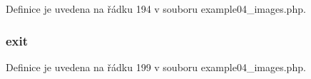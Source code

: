 Definice je uvedena na řádku 194 v souboru example04\-\_\-images.\-php.

\hypertarget{example04__images_8php_a6733eb5f605d09eaede9845835d71c4e}{
\subsubsection[{exit}]{\setlength{\rightskip}{0pt plus 5cm}exit}}\label{example04__images_8php_a6733eb5f605d09eaede9845835d71c4e}


Definice je uvedena na řádku 199 v souboru example04\-\_\-images.\-php.

